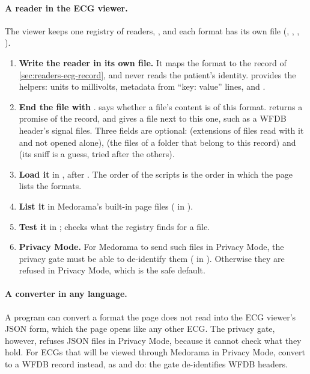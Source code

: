 \paragraph{A reader in the ECG viewer.} The viewer keeps one registry of readers,
, and each format has its own file (, ,
, ).
\begin{enumerate}
\item \textbf{Write the reader in its own file.} It maps the format to the record of
  \cref{sec:readers-ecg-record}, and never reads the patient's identity.  provides
  the helpers: units to millivolts, metadata from ``key: value'' lines, and .
\item \textbf{End the file with} .
   says whether a file's content is of this format.
   returns a promise of the record, and 
  gives a file next to this one, such as a WFDB header's signal files. Three fields are
  optional:  (extensions of files read with it and not opened alone),
   (the files of a folder that belong to this record) and  (its sniff is a
  guess, tried after the others).
\item \textbf{Load it} in , after . The order of the
  scripts is the order in which the page lists the formats.
\item \textbf{List it} in Medorama's built-in page files ( in
  ).
\item \textbf{Test it} in ;  checks what the
  registry finds for a file.
\item \textbf{Privacy Mode.} For Medorama to send such files in Privacy Mode, the privacy gate
  must be able to de-identify them ( in ). Otherwise
  they are refused in Privacy Mode, which is the safe default.
\end{enumerate}

\paragraph{A converter in any language.} A program can convert a format the page does not read
into the ECG viewer's JSON form, which the page opens like any other ECG. The privacy gate,
however, refuses JSON files in Privacy Mode, because it cannot check what they hold. For ECGs that
will be viewed through Medorama in Privacy Mode, convert to a WFDB record instead, as
 and  do: the gate de-identifies WFDB headers.

